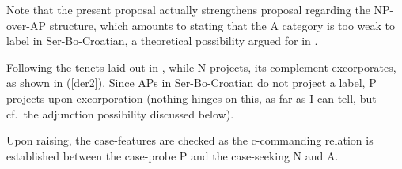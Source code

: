 \documentclass[output=paper]{langsci/langscibook}
\begin{document}
\begin{exe}
	\ex
		\hfill
	\hfill\null
\label{der1}
\end{exe}

Note that the present proposal actually strengthens 
proposal regarding the NP-over-AP structure, which amounts to stating that the
A category is too weak to label in Ser-Bo-Croatian, a
theoretical possibility argued for in \citet{Chomsky2013}.

Following the tenets laid out in , while
N projects, its complement excorporates, as shown in
(\ref{der2}). Since APs in Ser-Bo-Croatian do not project a
label, P projects upon excorporation (nothing hinges on this, as far as I can
tell, but cf.\ the adjunction possibility discussed below).

Upon raising, the case-features are checked as the c-commanding relation is
established between the case-probe P and the case-seeking
N and A.

\begin{exe}
	\ex

\label{der2}
\end{exe}
\end{document}
